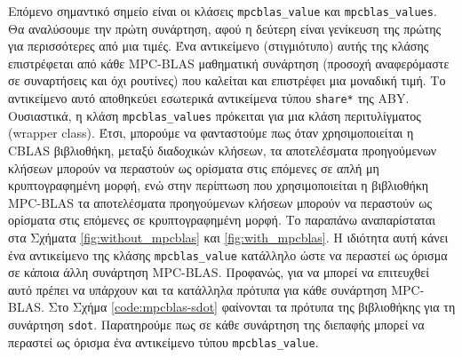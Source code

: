 Επόμενο σημαντικό σημείο είναι οι κλάσεις \texttt{mpcblas_value} και \texttt{mpcblas_values}. Θα αναλύσουμε την πρώτη συνάρτηση, αφού η δεύτερη είναι γενίκευση της πρώτης για περισσότερες από μια τιμές. Ένα αντικείμενο (στιγμιότυπο) αυτής της κλάσης επιστρέφεται από κάθε MPC-BLAS μαθηματική συνάρτηση (προσοχή αναφερόμαστε σε συναρτήσεις και όχι ρουτίνες) που καλείται και επιστρέφει μια μοναδική τιμή. Το αντικείμενο αυτό αποθηκεύει εσωτερικά αντικείμενα τύπου \texttt{share*} της ABY. Ουσιαστικά, η κλάση \texttt{mpcblas_values} πρόκειται για μια κλάση περιτυλίγματος (wrapper class). Έτσι, μπορούμε να φανταστούμε πως όταν χρησιμοποιείται η CBLAS βιβλιοθήκη, μεταξύ διαδοχικών κλήσεων, τα αποτελέσματα προηγούμενων κλήσεων μπορούν να περαστούν ως ορίσματα στις επόμενες σε απλή μη κρυπτογραφημένη μορφή, ενώ στην περίπτωση που χρησιμοποιείται η βιβλιοθήκη MPC-BLAS τα αποτελέσματα προηγούμενων κλήσεων μπορούν να περαστούν ως ορίσματα στις επόμενες σε κρυπτογραφημένη μορφή. Το παραπάνω αναπαρίσταται στα Σχήματα \ref{fig:without_mpcblas} και \ref{fig:with_mpcblas}. Η ιδιότητα αυτή κάνει ένα αντικείμενο της κλάσης \texttt{mpcblas_value} κατάλληλο ώστε να περαστεί ως όρισμα σε κάποια άλλη συνάρτηση MPC-BLAS. Προφανώς, για να μπορεί να επιτευχθεί αυτό πρέπει να υπάρχουν και τα κατάλληλα πρότυπα για κάθε συνάρτηση MPC-BLAS. Στο Σχήμα \ref{code:mpcblas-sdot} φαίνονται τα πρότυπα της βιβλιοθήκης για τη συνάρτηση \texttt{sdot}. Παρατηρούμε πως σε κάθε συνάρτηση της διεπαφής μπορεί να περαστεί ως όρισμα ένα αντικείμενο τύπου \texttt{mpcblas_value}.

